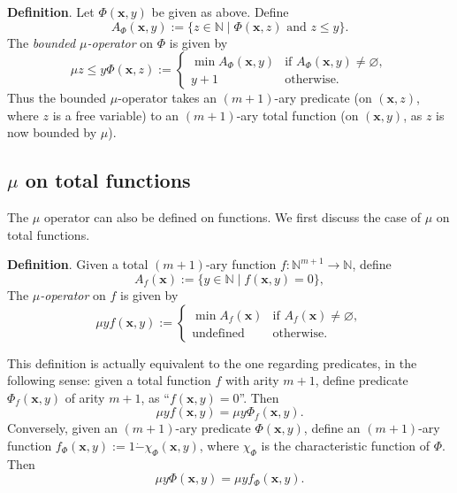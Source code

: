 \documentclass[12pt]{article}
\begin{document}
\textbf{Definition}.  Let $\Phi(\boldsymbol{x},y)$ be given as above.  Define $$A_{\Phi}(\boldsymbol{x},y):=\lbrace z \in \mathbb{N} \mid \Phi(\boldsymbol{x},z)\mbox{ and }z\le y \rbrace.$$ The \emph{bounded $\mu$-operator} on $\Phi$ is given by 
\begin{displaymath}
\mu z\le y \Phi(\boldsymbol{x},z) := \left\{
\begin{array}{ll}
\min A_{\Phi}(\boldsymbol{x},y) & \textrm{if } A_{\Phi}(\boldsymbol{x},y)\ne \varnothing, \\
y+1 & \textrm{otherwise.}
\end{array}
\right.
\end{displaymath}
Thus the bounded $\mu$-operator takes an $(m+1)$-ary predicate (on $(\boldsymbol{x},z)$, where $z$ is a free variable) to an $(m+1)$-ary total function (on $(\boldsymbol{x},y)$, as $z$ is now bounded by $\mu$).

\subsection*{$\mu$ on total functions}

The $\mu$ operator can also be defined on functions.  We first discuss the case of $\mu$ on total functions.  

\textbf{Definition}.  Given a total $(m+1)$-ary function $f:\mathbb{N}^{m+1}\to \mathbb{N}$, define $$A_f(\boldsymbol{x}):=\lbrace y \in \mathbb{N} \mid f(\boldsymbol{x},y)=0 \rbrace,$$
The \emph{$\mu$-operator} on $f$ is given by 
\begin{displaymath}
\mu y f(\boldsymbol{x},y) := \left\{
\begin{array}{ll}
\min A_f(\boldsymbol{x}) & \textrm{if } A_f(\boldsymbol{x})\ne \varnothing, \\
\textrm{undefined} & \textrm{otherwise.}
\end{array}
\right.
\end{displaymath}

This definition is actually equivalent to the one regarding predicates, in the following sense: given a total function $f$ with arity $m+1$, define predicate $\Phi_f(\boldsymbol{x},y)$ of arity $m+1$, as ``$f(\boldsymbol{x},y)=0$''.  Then $$\mu y f(\boldsymbol{x},y) = \mu y \Phi_f(\boldsymbol{x},y).$$  Conversely, given an $(m+1)$-ary predicate $\Phi(\boldsymbol{x},y)$, define an $(m+1)$-ary function $f_{\Phi}(\boldsymbol{x},y):=1\dot{-} \chi_{\Phi}(\boldsymbol{x},y)$, where $\chi_{\Phi}$ is the characteristic function of $\Phi$.  Then $$\mu y \Phi(\boldsymbol{x},y) = \mu y f_{\Phi}(\boldsymbol{x},y).$$
\end{document}

